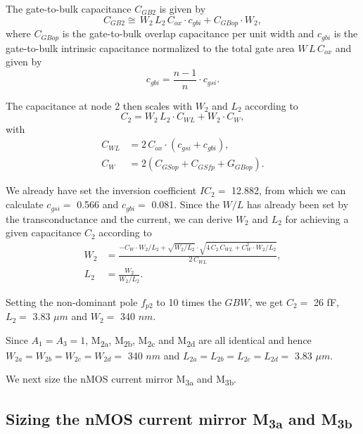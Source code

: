 \documentclass[
  a4paper,
  DIV=11,
  numbers=noendperiod]{scrreprt}
\begin{document}
The gate-to-bulk capacitance \(C_{GB2}\) is given by \begin{equation}
  C_{GB2} \cong \,W_2\,L_2\,C_{ox} \cdot c_{gbi} + C_{GBop} \cdot W_2,
\end{equation} where \(C_{GBop}\) is the gate-to-bulk overlap
capacitance per unit width and \(c_{gbi}\) is the gate-to-bulk intrinsic
capacitance normalized to the total gate area \(W\,L\,C_{ox}\) and given
by \begin{equation}
  c_{gbi} = \frac{n-1}{n} \cdot c_{gsi}.
\end{equation}

The capacitance at node 2 then scales with \(W_2\) and \(L_2\) according
to \begin{equation}
  C_2 = W_2\,L_2 \cdot C_{WL} + W_2 \cdot C_W,
\end{equation} with \begin{align}
  C_{WL} &= 2\,C_{ox} \cdot (c_{gsi} + c_{gbi}),\\
  C_W &= 2(C_{GSop} + C_{GSfp} + G_{GBop}).
\end{align}

We already have set the inversion coefficient \(IC_2 =\) 12.882, from
which we can calculate \(c_{gsi} =\) 0.566 and \(c_{gbi} =\) 0.081.
Since the \(W/L\) has already been set by the transconductance and the
current, we can derive \(W_2\) and \(L_2\) for achieving a given
capacitance \(C_2\) according to \begin{align}
  W_2 &= \frac{-C_W \cdot W_2/L_2 + \sqrt{W_2/L_2} \cdot \sqrt{4\,C_2\,C_{WL}+C_W^2 \cdot W_2/L_2}}{2\,C_{WL}},\\
  L_2 &= \frac{W_2}{W_2/L_2}.
\end{align}

Setting the non-dominant pole \(f_{p2}\) to 10 times the \(GBW\), we get
\(C_2 =\) 26 fF, \(L_2 =\) 3.83 \(\mu m\) and \(W_2 =\) 340 \(nm\).

Since \(A_1=A_3=1\), M\textsubscript{2a}, M\textsubscript{2b},
M\textsubscript{2c} and M\textsubscript{2d} are all identical and hence
\(W_{2a} = W_{2b} = W_{2c} = W_{2d} =\) 340 \(nm\) and
\(L_{2a} = L_{2b} = L_{2c} = L_{2d} =\) 3.83 \(\mu m\).

We next size the nMOS current mirror M\textsubscript{3a} and
M\textsubscript{3b}.

\subsection{\texorpdfstring{Sizing the nMOS current mirror
M\textsubscript{3a} and
M\textsubscript{3b}}{Sizing the nMOS current mirror M3a and M3b}}\label{sizing-the-nmos-current-mirror-m3a-and-m3b}
\end{document}

